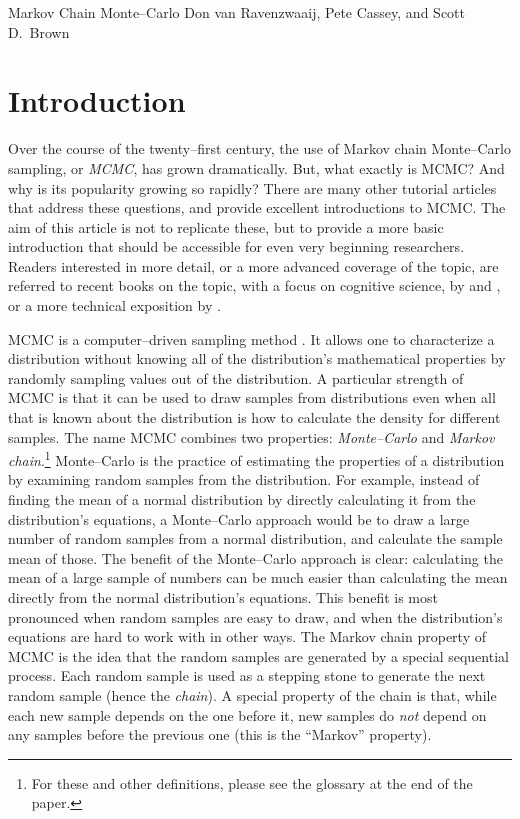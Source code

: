 {Markov Chain Monte--Carlo}
{Don van Ravenzwaaij, Pete Cassey, and Scott D.\ Brown} 

\section{Introduction}

Over the course of the twenty--first century, the use of Markov chain Monte--Carlo sampling, or \emph{MCMC}, has grown dramatically. But, what exactly is MCMC? And why is its popularity growing so rapidly? There are many other tutorial articles that address these questions, and provide excellent introductions to MCMC. The aim of this article is not to replicate these, but to provide a more basic introduction that should be accessible for even very beginning researchers. Readers interested in more detail, or a more advanced coverage of the topic, are referred to recent books on the topic, with a focus on cognitive science, by  and , or a more technical exposition by .

MCMC is a computer--driven sampling method \cite{GamermanLopes2006,GilksEtAl1996}. It allows one to characterize a distribution without knowing all of the distribution's mathematical properties by randomly sampling values out of the distribution. A particular strength of MCMC is that it can be used to draw samples from distributions even when all that is known about the distribution is how to calculate the density for different samples. The name MCMC combines two properties: \emph{Monte--Carlo} and \emph{Markov chain}.\footnote{For these and other definitions, please see the glossary at the end of the paper.} Monte--Carlo is the practice of estimating the properties of a distribution by examining random samples from the distribution. For example, instead of finding the mean of a normal distribution by directly calculating it from the distribution's equations, a Monte--Carlo approach would be to draw a large number of random samples from a normal distribution, and calculate the sample mean of those. The benefit of the Monte--Carlo approach is clear: calculating the mean of a large sample of numbers can be much easier than calculating the mean directly from the normal distribution's equations. This benefit is most pronounced when random samples are easy to draw, and when the distribution's equations are hard to work with in other ways. The Markov chain property of MCMC is the idea that the random samples are generated by a special sequential process. Each random sample is used as a stepping stone to generate the next random sample (hence the \emph{chain}). A special property of the chain is that, while each new sample depends on the one before it, new samples do \emph{not} depend on any samples before the previous one (this is the ``Markov'' property).

